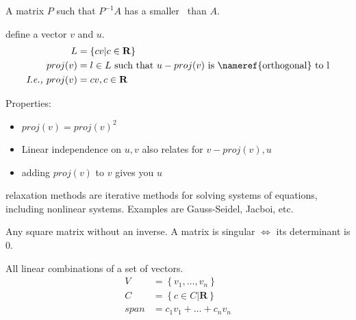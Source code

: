 \begin{definition}[Preconditoner]
    A matrix $P$ such that $P^{-1}A$ has a smaller~
    than $A$.

\end{definition}

\begin{definition}[Projection]
    define a vector $v$ and $u$.
    \begin{align*}
        L &= \left\{cv | c \in \mathbf{R} \right\}  \\
        proj(v) &= l \in L \text{\ such that\ } u - proj(v) 
        \text{\ is~\nameref{orthogonal} to l}  \\
        \textit{I.e., } proj(v) &= cv, c \in \mathbf{R}
    \end{align*}

    Properties:
    \begin{itemize}
        \item $proj(v) = proj(v)^{2}$
        \item Linear independence on $u, v$ also relates for $v - proj(v), u$
        \item adding $proj(v)$ to $v$ gives you $u$
    \end{itemize}

\end{definition}

\begin{definition}
     relaxation methods are iterative methods for solving systems of equations,
     including nonlinear systems. Examples are Gauss-Seidel, Jacboi, etc.

\end{definition}

\begin{definition}
    Any square matrix without an inverse.
    A matrix is singular $\iff$ its determinant is 0.

\end{definition}

\begin{definition}\label{vectorspan}
    All linear combinations of a set of vectors.
    \begin{align*}
        V &= \left\{v_{1}, \dots, v_n\right\} \\
        C &= \left\{c \in C | \mathbf{R}\right\} \\
        span &= c_{1}v_{1} + \dots + c_{n}v_{n}
    \end{align*}
\end{definition}

